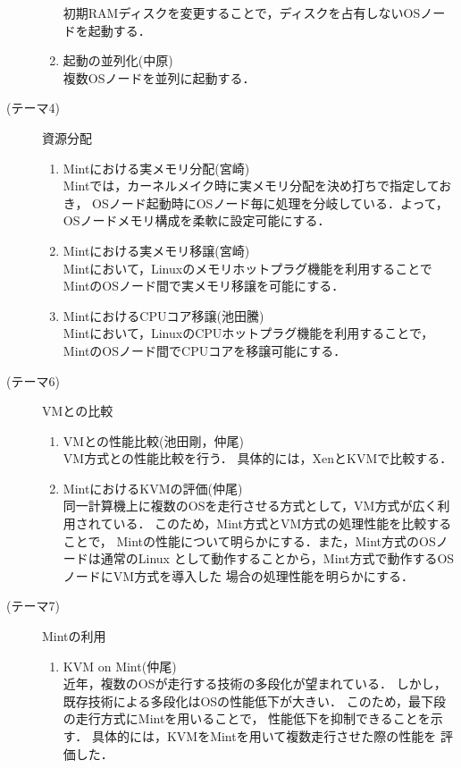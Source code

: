 \documentclass[12pt]{jsarticle}
\begin{document}
\begin{description}
\begin{enumerate}
                初期RAMディスクを変更することで，ディスクを占有しないOSノードを起動する．
            \item 起動の並列化(中原)\\
                複数OSノードを並列に起動する．
        \end{enumerate}
    \item[(テーマ4)] 資源分配
        \begin{enumerate}
            \item Mintにおける実メモリ分配(宮崎)\\
                Mintでは，カーネルメイク時に実メモリ分配を決め打ちで指定しておき，
                OSノード起動時にOSノード毎に処理を分岐している．よって，
                OSノードメモリ構成を柔軟に設定可能にする．
            \item Mintにおける実メモリ移譲(宮崎)\\
                Mintにおいて，Linuxのメモリホットプラグ機能を利用することで
                MintのOSノード間で実メモリ移譲を可能にする．
            \item MintにおけるCPUコア移譲(池田騰)\\
                Mintにおいて，LinuxのCPUホットプラグ機能を利用することで，
                MintのOSノード間でCPUコアを移譲可能にする．
        \end{enumerate}
    \item[(テーマ6)]VMとの比較
        \begin{enumerate}
            \item VMとの性能比較(池田剛，仲尾)\\
                VM方式との性能比較を行う．
                具体的には，XenとKVMで比較する．
            \item MintにおけるKVMの評価(仲尾)\\
                同一計算機上に複数のOSを走行させる方式として，VM方式が広く利用されている．
                このため，Mint方式とVM方式の処理性能を比較することで，
                Mintの性能について明らかにする．また，Mint方式のOSノードは通常のLinux
                として動作することから，Mint方式で動作するOSノードにVM方式を導入した
                場合の処理性能を明らかにする．
        \end{enumerate}
    \item[(テーマ7)]Mintの利用
        \begin{enumerate}
            \item KVM on Mint(仲尾)\\
                近年，複数のOSが走行する技術の多段化が望まれている．
                しかし，既存技術による多段化はOSの性能低下が大きい．
                このため，最下段の走行方式にMintを用いることで，
                性能低下を抑制できることを示す．
                具体的には，KVMをMintを用いて複数走行させた際の性能を
                評価した．
        \end{enumerate}
\end{description}
\end{document}
